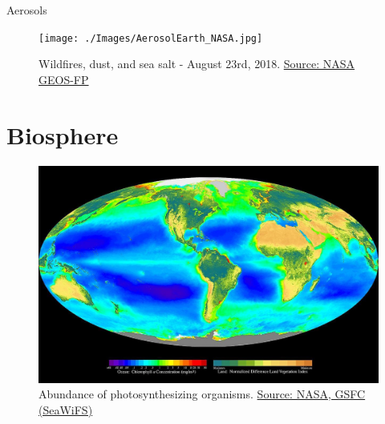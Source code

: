 \documentclass{beamer}
\begin{document}
\begin{frame}{Aerosols}
\begin{figure}
\texttt{[image: ./Images/AerosolEarth\_NASA.jpg]}
\caption{\label{fig:Aerosols} Wildfires, dust, and sea salt - August 23rd, 2018. \href{https://earthobservatory.nasa.gov/images/92654/just-another-day-on-aerosol-earth}{\tiny Source: NASA GEOS-FP } }
\end{figure}
\end{frame}



\section{Biosphere}

\begin{frame}
\begin{figure}
\includegraphics[width=0.9\linewidth]{./Images/Seawifs_global_biosphere.jpg}
\caption{\label{fig:NPP} Abundance of photosynthesizing organisms. \href{http://oceancolor.gsfc.nasa.gov/SeaWiFS/BACKGROUND/Gallery/index.html}{\tiny Source: NASA, GSFC (SeaWiFS)}}
\end{figure}
\end{frame}
\end{document}
